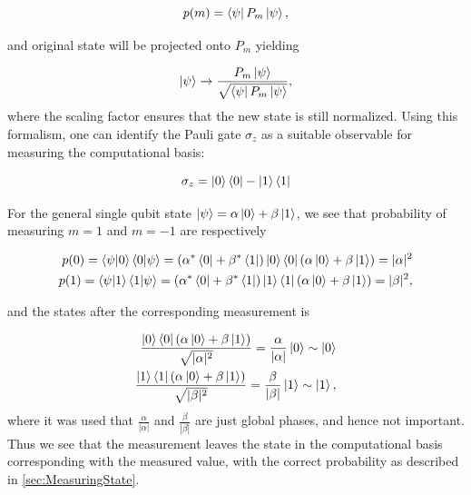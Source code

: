 \begin{equation}
    p(m) = \bra{\psi}P_m\ket{\psi},
\end{equation}

and original state will be projected onto $P_m$ yielding 

\begin{equation}
    \ket{\psi} \rightarrow \frac{P_m\ket{\psi}}{\sqrt{\bra{\psi}P_m\ket{\psi}}},
\end{equation}
where the scaling factor ensures that the new state is still normalized. Using this formalism, one can identify the Pauli gate $\sigma_z$ as a suitable observable for measuring the computational basis:

\begin{equation}
    \sigma_z = \ket{0}\bra{0} - \ket{1}\bra{1}
\end{equation}

For the general single qubit state $\ket{\psi} = \alpha \ket{0} + \beta \ket{1}$, we see that probability of measuring $m=1$ and $m=-1$ are respectively

\begin{equation}
\begin{aligned}
    p(0) = \bra{\psi} \ket{0}\bra{0} \ket{\psi} = (\alpha^* \bra{0} + \beta^* \bra{1}) \ket{0}\bra{0} (\alpha \ket{0} + \beta \ket{1}) = |\alpha|^2\\
    p(1) = \bra{\psi} \ket{1}\bra{1} \ket{\psi} = (\alpha^* \bra{0} + \beta^* \bra{1}) \ket{1}\bra{1} (\alpha \ket{0} + \beta \ket{1}) = |\beta|^2,
\end{aligned}
\end{equation}

and the states after the corresponding measurement is 


\begin{equation}\label{eq:CompBasisMeasurement}
\begin{aligned}
    \frac{\ket{0}\bra{0}(\alpha \ket{0} + \beta \ket{1})}{\sqrt{|\alpha|^2}} = 
    \frac{\alpha}{|\alpha|} \ket{0} \sim \ket{0} \\
    \frac{\ket{1}\bra{1}(\alpha \ket{0} + \beta \ket{1})}{\sqrt{|\beta|^2}} = 
    \frac{\beta}{|\beta|} \ket{1} \sim \ket{1},
\end{aligned}
\end{equation}
where it was used that $\frac{\alpha}{|\alpha|}$ and $\frac{\beta}{|\beta|}$ are just global phases, and hence not important. Thus we see that the measurement leaves the state in the computational basis corresponding with the measured value, with the correct probability as described in \autoref{sec:MeasuringState}.

